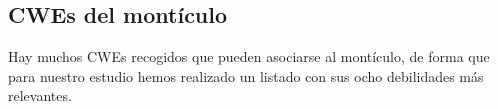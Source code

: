 \documentclass[12pt, a4paper, twoside]{article}
\begin{document}


\subsection{CWEs del montículo}
\label{sec:cwe-heap}
Hay muchos CWEs recogidos que pueden asociarse al montículo, de forma que para nuestro estudio hemos realizado un listado con sus ocho debilidades más relevantes.
\end{document}
